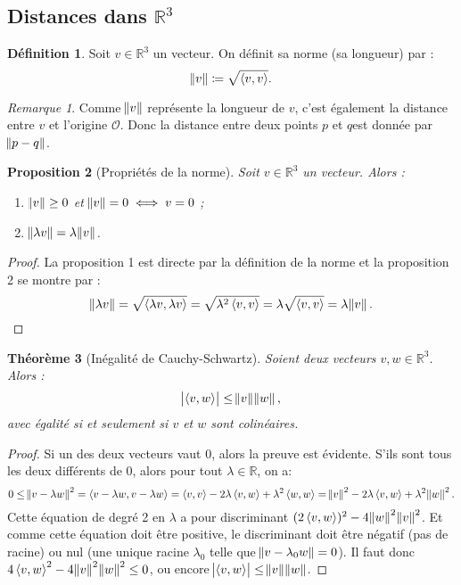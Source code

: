 \documentclass{article}
\newcommand{\R}{\mathbb R}
\newcommand{\scpr}[2]{\left\langle #1, #2\right\rangle}
\newtheorem{thm}{Théorème}[section]
\newtheorem{prp}[thm]{Proposition}
\theoremstyle{definition}
\newtheorem{déf}[thm]{Définition}
\theoremstyle{remark}
\newtheorem*{rmq}{Remarque}
\begin{document}
	\subsection{Distances dans $\R^3$}
		\begin{déf} Soit $v \in \R^3$ un vecteur. On définit sa norme (sa longueur) par : \[\norm v \coloneqq \sqrt {\scpr vv}.\] \end{déf}

		\begin{rmq} Comme $\norm v$ représente la longueur de $v$, c'est également la distance entre $v$ et l'origine $\mathcal O$. Donc la distance entre deux points $p$ et
		$q$est donnée par $\norm {p-q}$. \end{rmq}

		\begin{prp}[Propriétés de la norme] Soit $v \in \R^3$ un vecteur. Alors :
		\begin{enumerate}
			\item $\norm v \geq 0$ et $\norm v = 0 \iff v = 0$ ;
			\item $\norm {\lambda v} = \lambda \norm v$.
		\end{enumerate}
		\end{prp}

		\begin{proof} La proposition 1 est directe par la définition de la norme et la proposition 2 se montre par :
		\[\norm {\lambda v} = \sqrt {\scpr {\lambda v}{\lambda v}} = \sqrt {\lambda^2\scpr vv} = \lambda \sqrt {\scpr vv} = \lambda \norm v.\] \end{proof}

		\begin{thm}[Inégalité de Cauchy-Schwartz] Soient deux vecteurs $v, w \in \R^3$. Alors :
		\[\abs{\scpr vw} \leq \norm v\norm w,\]
		avec égalité si et seulement si $v$ et $w$ sont colinéaires. \end{thm}

		\begin{proof} Si un des deux vecteurs vaut $0$, alors la preuve est évidente. S'ils sont tous les deux différents de $0$, alors pour tout $\lambda \in \R$, on a:
		\[0 \leq \norm{v-\lambda w}^2 = \scpr {v-\lambda w}{v-\lambda w} = \scpr vv -2\lambda \scpr vw + \lambda^2\scpr ww = \norm v^2 -2\lambda \scpr vw + \lambda^2\norm w^2.\]
		Cette équation de degré 2 en $\lambda$ a pour discriminant $(2\scpr vw)^2 - 4\norm w^2\norm v^2$. Et comme cette équation doit être positive, le discriminant
		doit être négatif (pas de racine) ou nul (une unique racine $\lambda_0$ telle que $\norm {v-\lambda_0w} = 0$). Il faut donc
		$4\scpr vw^2 - 4\norm v^2\norm w^2 \leq 0$, ou encore $\abs{\scpr vw} \leq \norm v\norm w$. \end{proof}
\end{document}
